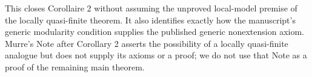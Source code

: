 This closes Corollaire 2 without assuming the unproved local-model
premise of the locally quasi-finite theorem. It also identifies
exactly how the manuscript's generic modularity condition supplies
the published generic nonextension axiom. Murre's Note after
Corollary 2 asserts the possibility of a locally quasi-finite
analogue but does not supply its axioms or a proof; we do not use
that Note as a proof of the remaining main theorem.
